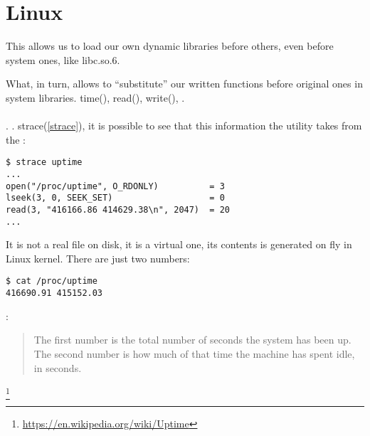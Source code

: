 \section{ \InENRU Linux}

\label{ld_preload}

{This allows us to load our own dynamic libraries before others, even before system ones, like} libc.so.6.

{What, in turn, allows to ``substitute'' our written functions before original ones in system libraries.}
time(), read(), write(), . \\
\\
.
.
 strace(\ref{strace}), 
{it is possible to see that this information the utility takes from the} 
:

\begin{lstlisting}
$ strace uptime 
...
open("/proc/uptime", O_RDONLY)          = 3
lseek(3, 0, SEEK_SET)                   = 0
read(3, "416166.86 414629.38\n", 2047)  = 20
...
\end{lstlisting}

{It is not a real file on disk, it is a virtual one, its contents is generated on fly in Linux kernel.}
{There are just two numbers}:

\begin{lstlisting}
$ cat /proc/uptime
416690.91 415152.03
\end{lstlisting}

:

\begin{framed}
\begin{quotation}
The first number is the total number of seconds the system has been up.
The second number is how much of that time the machine has spent idle, in seconds.
\end{quotation}
\end{framed}\footnote{\url{https://en.wikipedia.org/wiki/Uptime}}


